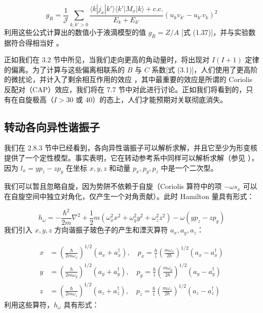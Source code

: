 \begin{equation}
g_{R}=\frac{1}{\mathcal{J}}\sum_{k,k'>0}\frac{\langle k|j_{x}|k'\rangle\langle k'|M_{x}|k\rangle+\text{c.c.}}{E_{k}+E_{k'}}\left(u_{k}v_{k'}-u_{k'}v_{k}\right)^{2}\label{eq:3.96}
\end{equation}
利用这些公式计算出的数值小于液滴模型的值 $g_{R}=Z/A$ {[}式 (1.37){]}，并与实验数据符合得相当好 \cite{MSV72}。

正如我们在 3.2 节中所见，当我们走向更高的角动量时，将出现对 $I(I+1)$ 定律的偏离。为了计算与这些偏离相联系的 $B$
与 $C$ 系数{[}式 (3.1){]}，人们使用了更高阶的微扰论，并计入了剩余相互作用的效应 \cite{Ma65,Ma67a,MR70}，其中最重要的效应是所谓的
Coriolis 反配对（CAP）效应，我们将在 7.7 节中对此进行讨论。正如我们将看到的，只有在自旋极高（$I>30$ 或 40）的态上，人们才能预期对关联彻底消失。

\subsection{转动各向异性谐振子}

我们在 2.8.3 节中已经看到，各向异性谐振子可以解析求解，并且它至少为形变核提供了一个定性模型。事实表明，它在转动参考系中同样可以解析求解（参见
\cite{Va56,Ze75,RBK75,GMZ78}），因为 $l_{x}=yp_{z}-zp_{y}$ 在坐标 $x,y,z$
和动量 $p_{x},p_{y},p_{z}$ 中是一个二次型。

我们可以暂且忽略自旋，因为势阱不依赖于自旋（Coriolis 算符中的项 $-\omega s_{x}$ 可以在自旋空间中独立对角化，仅产生一个对角贡献）。此时
Hamilton 量具有形式：

\begin{equation}
h_{\omega}=-\frac{\hbar^{2}}{2m}\nabla^{2}+\frac{1}{2}m\left(\omega^{2}_{x}x^{2}+\omega^{2}_{y}y^{2}+\omega^{2}_{z}z^{2}\right)-\omega\left(yp_{z}-zp_{y}\right)\label{eq:3.97}
\end{equation}
我们引入 $x,y,z$ 方向谐振子玻色子的产生和湮灭算符 $a_{x},a_{y},a_{z}$：

\begin{align}
x & =\left(\frac{\hbar}{2m\omega_{x}}\right)^{1/2}\left(a_{x}+a^{\dagger}_{x}\right),\quad p_{x}=\frac{\hbar}{\mathrm{i}}\left(\frac{m\omega_{x}}{2\hbar}\right)^{1/2}\left(a_{x}-a^{\dagger}_{x}\right)\nonumber \\
y & =\left(\frac{\hbar}{2m\omega_{y}}\right)^{1/2}\left(a_{y}+a^{\dagger}_{y}\right),\quad p_{y}=\frac{\hbar}{\mathrm{i}}\left(\frac{m\omega_{y}}{2\hbar}\right)^{1/2}\left(a_{y}-a^{\dagger}_{y}\right)\label{eq:3.98}\\
z & =\left(\frac{\hbar}{2m\omega_{z}}\right)^{1/2}\left(a_{z}+a^{\dagger}_{z}\right),\quad p_{z}=\frac{\hbar}{\mathrm{i}}\left(\frac{m\omega_{z}}{2\hbar}\right)^{1/2}\left(a_{z}-a^{\dagger}_{z}\right)\nonumber 
\end{align}
利用这些算符，$h_{\omega}$ 具有形式：

